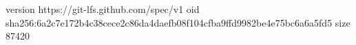 version https://git-lfs.github.com/spec/v1
oid sha256:6a2c7e172b4c38cece2c86da4daefb08f104cfba9ffd9982be4e75bc6a6a5fd5
size 87420
